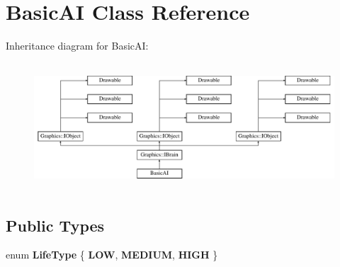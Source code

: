 \section{Basic\+A\+I Class Reference}
\label{class_basic_a_i}
Inheritance diagram for Basic\+A\+I\+:\begin{figure}[H]
\begin{center}
\leavevmode
\includegraphics[height=4.786325cm]{class_basic_a_i}
\end{center}
\end{figure}
\subsection*{Public Types}
\begin{DoxyCompactItemize}
\item 
enum {\bfseries Life\+Type} \{ {\bfseries L\+O\+W}, 
{\bfseries M\+E\+D\+I\+U\+M}, 
{\bfseries H\+I\+G\+H}
 \}\label{class_basic_a_i_aa1eb6fb4a96bcfecdfab62d9f94e6b1d}

\end{DoxyCompactItemize}
